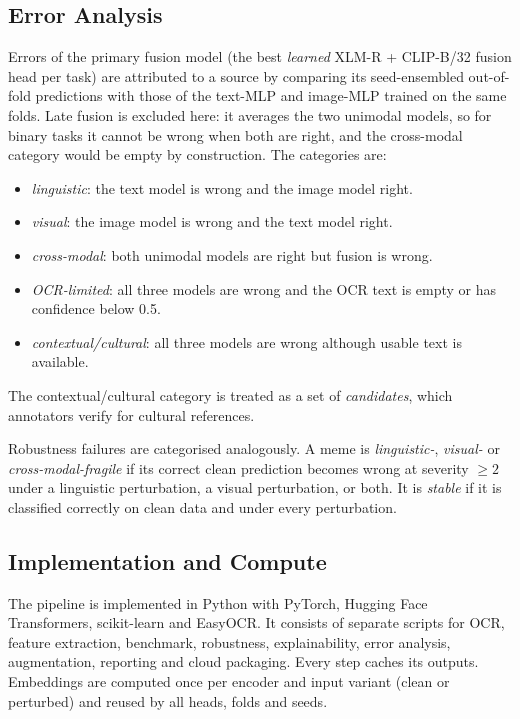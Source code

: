 \subsection{Error Analysis}
\label{sec:method:errors}

Errors of the primary fusion model (the best \emph{learned} XLM-R + CLIP-B/32 fusion head per task) are attributed
to a source by comparing its seed-ensembled out-of-fold predictions with those of the text-MLP and image-MLP trained
on the same folds. Late fusion is excluded here: it averages the two unimodal models, so for binary tasks it cannot
be wrong when both are right, and the cross-modal category would be empty by construction. The categories are:
\begin{itemize}
  \item \emph{linguistic}: the text model is wrong and the image model right.
  \item \emph{visual}: the image model is wrong and the text model right.
  \item \emph{cross-modal}: both unimodal models are right but fusion is wrong.
  \item \emph{OCR-limited}: all three models are wrong and the OCR text is empty or has confidence below 0.5.
  \item \emph{contextual/cultural}: all three models are wrong although usable text is available.
\end{itemize}
The contextual/cultural category is treated as a set of \emph{candidates}, which annotators verify for cultural
references.

Robustness failures are categorised analogously. A meme is \emph{linguistic-}, \emph{visual-} or
\emph{cross-modal-fragile} if its correct clean prediction becomes wrong at severity $\geq2$ under a linguistic
perturbation, a visual perturbation, or both. It is \emph{stable} if it is classified correctly on clean data and
under every perturbation.

\subsection{Implementation and Compute}
\label{sec:method:impl}

The pipeline is implemented in Python with PyTorch, Hugging Face Transformers, scikit-learn and EasyOCR. It
consists of separate scripts for OCR, feature extraction, benchmark, robustness, explainability, error analysis,
augmentation, reporting and cloud packaging. Every step caches its outputs.
Embeddings are computed once per encoder and input variant (clean or perturbed) and reused by all heads, folds and
seeds.

